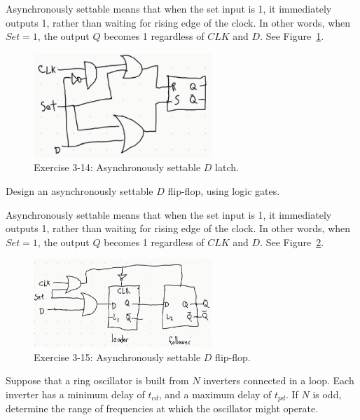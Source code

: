 \documentclass[12pt]{article}
\newenvironment{ex}[2][Exercise]{\begin{trivlist}
		\item[\hskip \labelsep {\bfseries #1}\hskip \labelsep {\bfseries #2.}]}{\end{trivlist}}
\newenvironment{sol}[1][Solution]{\begin{trivlist}
		\item[\hskip \labelsep {\bfseries #1:}]}{\end{trivlist}}
\begin{document}
\begin{sol}
	Asynchronously settable means that when the set input is 1, it immediately outputs 1, rather
	than waiting for rising edge of the clock. In other words, when $Set=1$, the output $Q$ becomes 1 regardless of $CLK$ and $D$. See Figure~\ref{03-14-async-settable-D-latch}.
	\begin{figure}
		\centering
		\includegraphics[width=0.6\textwidth]{03-14-async-settable-D-latch}
		\caption{Exercise 3-14: Asynchronously settable $D$ latch.}
		\label{03-14-async-settable-D-latch}
	\end{figure}
\end{sol}


\begin{ex}{3.15}
	Design an asynchronously settable $D$ flip-flop, using logic gates.
\end{ex}

\begin{sol}
	Asynchronously settable means that when the set input is 1, it immediately outputs 1, rather
	than waiting for rising edge of the clock. In other words, when $Set=1$, the output $Q$ becomes 1 regardless of $CLK$ and $D$. See Figure~\ref{03-15-async-settable-D-flip-flop}.
	\begin{figure}
		\centering
		\includegraphics[width=0.6\textwidth]{03-15-async-settable-D-flip-flop}
		\caption{Exercise 3-15: Asynchronously settable $D$ flip-flop.}
		\label{03-15-async-settable-D-flip-flop}
	\end{figure}
\end{sol}

\begin{ex}{3.16}
	Suppose that a ring oscillator is built from $N$ inverters connected in a loop. Each inverter has a minimum
	delay of  $t_{cd}$, and a maximum delay of $t_{pd}$. If $N$ is odd, determine the range of frequencies
	at which the oscillator might operate.
\end{ex}
\end{document}
